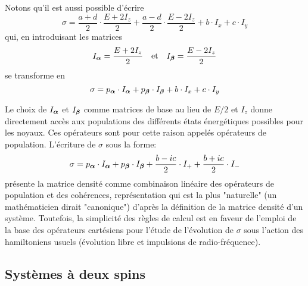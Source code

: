 Notons qu'il est aussi possible d'écrire
\begin{equation}
\sigma = \frac{a+d}{2} \cdot \frac{E + 2I_z}{2} + \frac{a-d}{2} \cdot \frac{E - 2I_z}{2}
+ b \cdot I_x + c \cdot I_y
\end{equation}
qui, en introduisant les matrices
\begin{equation}
I_{\boldsymbol{\alpha}} = \frac{E + 2I_z}{2} \quad \mbox{et} \quad I_{\boldsymbol{\beta}} = \frac{E - 2I_z}{2}
\end{equation}
se transforme en
\begin{equation}
\sigma = p_{\boldsymbol{\alpha}} \cdot I_{\boldsymbol{\alpha}} + p_{\boldsymbol{\beta}} \cdot I_{\boldsymbol{\beta}} + b \cdot I_x + c \cdot I_y
\end{equation}

Le choix de $I_{\boldsymbol{\alpha}}$ et $I_{\boldsymbol{\beta}}$ comme matrices de base au lieu de $E/2$ et $I_z$
donne directement accès aux populations des différents états énergétiques
possibles pour les noyaux.
Ces opérateurs sont pour cette raison appelés opérateurs de population.
L'écriture de $\sigma$ sous la forme:
\begin{equation}
\sigma = p_{\boldsymbol{\alpha}} \cdot I_{\boldsymbol{\alpha}} + p_{\boldsymbol{\beta}} \cdot I_{\boldsymbol{\beta}} 
+ \frac{b-ic}{2} \cdot I_+ + \frac{b+ic}{2} \cdot I_-
\end{equation}
présente la matrice densité comme combinaison linéaire des opérateurs
de population et des cohérences, représentation qui est la
plus "naturelle" (un mathématicien dirait "canonique")
d'après la définition de la matrice densité d'un système.
Toutefois, la simplicité des règles de calcul est en faveur de l'emploi de la
base des opérateurs cartésiens pour l'étude de l'évolution de $\sigma$
sous l'action des hamiltoniens usuels (évolution libre et impulsions de
radio-fréquence).

\subsection{Systèmes à deux spins}

